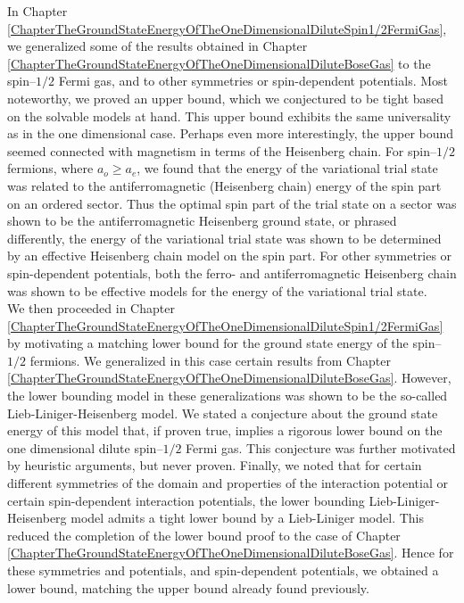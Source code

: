 In Chapter \ref{ChapterTheGroundStateEnergyOfTheOneDimensionalDiluteSpin1/2FermiGas}, we generalized some of the results obtained in Chapter \ref{ChapterTheGroundStateEnergyOfTheOneDimensionalDiluteBoseGas} to the spin--$ 1/2 $ Fermi gas, and to other symmetries or spin-dependent potentials. Most noteworthy, we proved an upper bound, which we conjectured to be tight based on the solvable models at hand. This upper bound exhibits the same universality as in the one dimensional case. Perhaps even more interestingly, the upper bound seemed connected with magnetism in terms of the Heisenberg chain. For spin--$ 1/2 $ fermions, where $ a_o\geq a_e $, we found that the energy of the variational trial state was related to the antiferromagnetic (Heisenberg chain) energy of the spin part on an ordered sector. Thus the optimal spin part of the trial state on a sector was shown to be the antiferromagnetic Heisenberg ground state, or phrased differently, the energy of the variational trial state was shown to be determined by an effective Heisenberg chain model on the spin part. For other symmetries or spin-dependent potentials, both the ferro- and antiferromagnetic Heisenberg chain was shown to be effective models for the energy of the variational trial state.\\
We then proceeded in Chapter \ref{ChapterTheGroundStateEnergyOfTheOneDimensionalDiluteSpin1/2FermiGas} by motivating a matching lower bound for the ground state energy of the spin--$ 1/2 $ fermions. We generalized in this case certain results from Chapter \ref{ChapterTheGroundStateEnergyOfTheOneDimensionalDiluteBoseGas}. However, the lower bounding model in these generalizations was shown to be the so-called Lieb-Liniger-Heisenberg model. We stated a conjecture about the ground state energy of this model that, if proven true, implies a rigorous lower bound on the one dimensional dilute spin--$ 1/2 $ Fermi gas. This conjecture was further motivated by heuristic arguments, but never proven. Finally, we noted that for certain different symmetries of the domain and properties of the interaction potential or certain spin-dependent interaction potentials, the lower bounding Lieb-Liniger-Heisenberg model admits a tight lower bound by a Lieb-Liniger model. This reduced the completion of the lower bound proof to the case of Chapter \ref{ChapterTheGroundStateEnergyOfTheOneDimensionalDiluteBoseGas}. Hence for these symmetries and potentials, and spin-dependent potentials, we obtained a lower bound, matching the upper bound already found previously.


